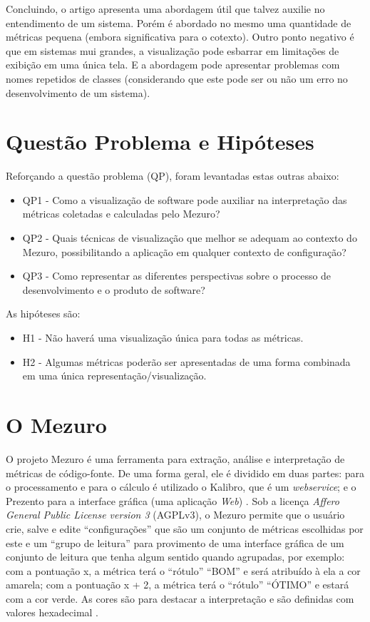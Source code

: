 Concluindo, o artigo apresenta uma abordagem útil que talvez auxilie no
entendimento de um sistema. Porém é abordado no mesmo uma quantidade de
métricas pequena (embora significativa para o cotexto). Outro ponto negativo é
que em sistemas mui grandes, a visualização pode esbarrar em limitações de
exibição em uma única tela. E a abordagem pode apresentar problemas com nomes
repetidos de classes (considerando que este pode ser ou não um erro no
desenvolvimento de um sistema).

\section{Questão Problema e Hipóteses}

Reforçando a questão problema (QP), foram levantadas estas outras abaixo:

\begin{itemize}
  \item QP1 - Como a visualização de software pode auxiliar na
  interpretação das métricas coletadas e calculadas pelo Mezuro?
  \item QP2 - Quais técnicas de visualização que melhor se adequam ao
  contexto do Mezuro, possibilitando a aplicação em qualquer contexto de
  configuração?
  \item QP3 - Como representar as diferentes perspectivas sobre o processo
  de desenvolvimento e o produto de software?
\end{itemize}

As hipóteses são:

\begin{itemize}
  \item H1 - Não haverá uma visualização única para todas as métricas.
  \item H2 - Algumas métricas poderão ser apresentadas de uma forma combinada
  em uma única representação/visualização.
\end{itemize}


\section{O Mezuro}

O projeto Mezuro é uma ferramenta para extração, análise e interpretação de
métricas de código-fonte. De uma forma geral, ele é dividido em duas partes:
para o processamento e para o cálculo é utilizado o Kalibro, que é um
\textit{webservice}; e o Prezento para a interface gráfica (uma aplicação
\textit{Web}) \cite{meirellesCibse2015}. Sob a licença
\textit{Affero General Public License version 3} (AGPLv3), o Mezuro permite que
o usuário crie, salve e edite ``configurações'' que são um conjunto de
métricas escolhidas por este e um ``grupo de leitura'' para provimento de uma
interface gráfica de um conjunto de leitura que tenha algum sentido quando
agrupadas, por exemplo: com a pontuação x, a métrica terá o ``rótulo'' ``BOM'' e
será atribuído à ela a cor amarela; com a pontuação x + 2, a métrica terá o
``rótulo'' ``ÓTIMO'' e estará com a cor verde. As cores são para destacar a
interpretação e são definidas com valores hexadecimal \cite{camarinhaOSS2015}.

